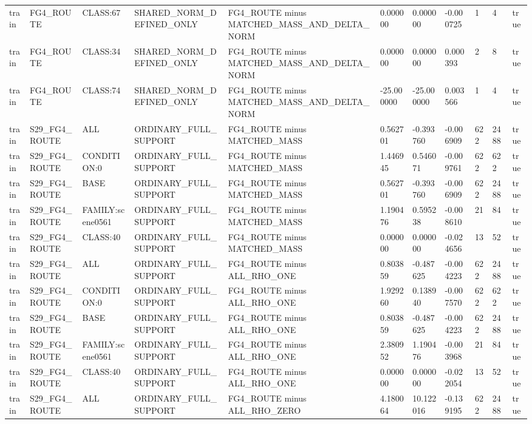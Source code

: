 \begin{tabular}{lllllllllll}
train & FG4\_ROUTE & CLASS:67 & SHARED\_NORM\_DEFINED\_ONLY & FG4\_ROUTE minus MATCHED\_MASS\_AND\_DELTA\_NORM & 0.000000 & 0.000000 & -0.000725 & 1 & 4 & true \\
train & FG4\_ROUTE & CLASS:34 & SHARED\_NORM\_DEFINED\_ONLY & FG4\_ROUTE minus MATCHED\_MASS\_AND\_DELTA\_NORM & 0.000000 & 0.000000 & 0.000393 & 2 & 8 & true \\
train & FG4\_ROUTE & CLASS:74 & SHARED\_NORM\_DEFINED\_ONLY & FG4\_ROUTE minus MATCHED\_MASS\_AND\_DELTA\_NORM & -25.000000 & -25.000000 & 0.003566 & 1 & 4 & true \\
train & S29\_FG4\_ROUTE & ALL & ORDINARY\_FULL\_SUPPORT & FG4\_ROUTE minus MATCHED\_MASS & 0.562701 & -0.393760 & -0.006909 & 622 & 2488 & true \\
train & S29\_FG4\_ROUTE & CONDITION:0 & ORDINARY\_FULL\_SUPPORT & FG4\_ROUTE minus MATCHED\_MASS & 1.446945 & 0.546071 & -0.009761 & 622 & 622 & true \\
train & S29\_FG4\_ROUTE & BASE & ORDINARY\_FULL\_SUPPORT & FG4\_ROUTE minus MATCHED\_MASS & 0.562701 & -0.393760 & -0.006909 & 622 & 2488 & true \\
train & S29\_FG4\_ROUTE & FAMILY:scene0561 & ORDINARY\_FULL\_SUPPORT & FG4\_ROUTE minus MATCHED\_MASS & 1.190476 & 0.595238 & -0.008610 & 21 & 84 & true \\
train & S29\_FG4\_ROUTE & CLASS:40 & ORDINARY\_FULL\_SUPPORT & FG4\_ROUTE minus MATCHED\_MASS & 0.000000 & 0.000000 & -0.024656 & 13 & 52 & true \\
train & S29\_FG4\_ROUTE & ALL & ORDINARY\_FULL\_SUPPORT & FG4\_ROUTE minus ALL\_RHO\_ONE & 0.803859 & -0.487625 & -0.004223 & 622 & 2488 & true \\
train & S29\_FG4\_ROUTE & CONDITION:0 & ORDINARY\_FULL\_SUPPORT & FG4\_ROUTE minus ALL\_RHO\_ONE & 1.929260 & 0.138940 & -0.007570 & 622 & 622 & true \\
train & S29\_FG4\_ROUTE & BASE & ORDINARY\_FULL\_SUPPORT & FG4\_ROUTE minus ALL\_RHO\_ONE & 0.803859 & -0.487625 & -0.004223 & 622 & 2488 & true \\
train & S29\_FG4\_ROUTE & FAMILY:scene0561 & ORDINARY\_FULL\_SUPPORT & FG4\_ROUTE minus ALL\_RHO\_ONE & 2.380952 & 1.190476 & -0.003968 & 21 & 84 & true \\
train & S29\_FG4\_ROUTE & CLASS:40 & ORDINARY\_FULL\_SUPPORT & FG4\_ROUTE minus ALL\_RHO\_ONE & 0.000000 & 0.000000 & -0.022054 & 13 & 52 & true \\
train & S29\_FG4\_ROUTE & ALL & ORDINARY\_FULL\_SUPPORT & FG4\_ROUTE minus ALL\_RHO\_ZERO & 4.180064 & 10.122016 & -0.139195 & 622 & 2488 & true \\

\end{tabular}
